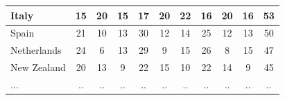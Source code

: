 \documentclass[12pt]{article}  %
\begin{document}
\begin{longtable}{l|c|c|c|c|c|c|c|c|c|c}
	\hline
	Italy                & 15                                                                     & 20                                                                     & 15                                                                     & 17                                                                     & 20                                                                     & 22                                                                     & 16                        & 20                          & 16                          & 53                         \\ 
	\hline
	Spain                & 21                                                                     & 10                                                                     & 13                                                                     & 30                                                                     & 12                                                                     & 14                                                                     & 25                        & 12                          & 13                          & 50                         \\ 
	\hline
	Netherlands          & 24                                                                     & 6                                                                      & 13                                                                     & 29                                                                     & 9                                                                      & 15                                                                     & 26                        & 8                           & 15                          & 47                         \\ 
	\hline
	New Zealand          & 20                                                                     & 13                                                                     & 9                                                                      & 22                                                                     & 15                                                                     & 10                                                                     & 22                        & 14                          & 9                           & 45                         \\ 
	\hline
	...                  & ..                                                                     & ..                                                                     & ..                                                                     & ..                                                                     & ..                                                                     & ..                                                                     & ..                        & ..                          & ..                          & ..                         \\

\end{longtable}
\end{document}
